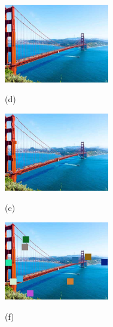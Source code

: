 \begin{figure}[!]
		\begin{minipage}[t]{.32\linewidth}
			\includegraphics[width=1.8in]{KADID/I71.jpg}
			\centerline{(d)}
		\end{minipage}
		\begin{minipage}[t]{.32\linewidth}
			\includegraphics[width=1.8in]{KADID/I71_20_05.jpg}
			\centerline{(e)}
		\end{minipage}
		\begin{minipage}[t]{.32\linewidth}
			\includegraphics[width=1.8in]{KADID/I71_23_05.jpg}
			\centerline{(f)}
		\end{minipage}
		

\end{figure}
